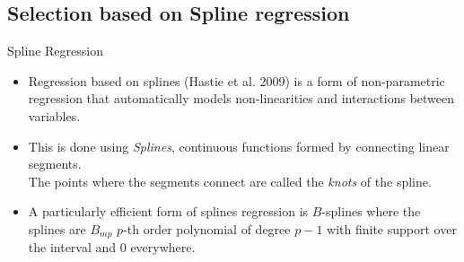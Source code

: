 \documentclass[handout]{beamer}
\begin{document}
\subsection{Selection based on Spline regression}

\begin{frame}{Spline Regression}
\begin{itemize}

\item Regression based on splines (Hastie et al. 2009) is a form of non-parametric
  regression that automatically models non-linearities and
  interactions between variables.
\item This is done using \emph{Splines},  continuous functions formed by connecting linear
segments. \\ The points where the segments connect are called the \emph{knots} of the spline.
\item A particularly efficient form of splines regression is  $B$-splines where the splines are  $B_{mp}$ $p$-th order polynomial of degree $p-1$ with finite support over the interval and 0 everywhere.
    
\end{itemize}
\end{frame}

\end{document}
